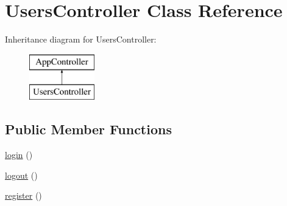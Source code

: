 \hypertarget{classUsersController}{
\section{\-Users\-Controller \-Class \-Reference}
\label{classUsersController}
}
\-Inheritance diagram for \-Users\-Controller\-:\begin{figure}[H]
\begin{center}
\leavevmode
\includegraphics[height=2.000000cm]{classUsersController}
\end{center}
\end{figure}
\subsection*{\-Public \-Member \-Functions}
\begin{DoxyCompactItemize}
\item 
\hyperlink{classUsersController_aacebe6314e911b87dfb28785e87519cc}{login} ()
\item 
\hyperlink{classUsersController_abd5055ae74c89e431b061463ef7f2787}{logout} ()
\item 
\hyperlink{classUsersController_aff5905416e027604f61edcbe2cac2692}{register} ()
\end{DoxyCompactItemize}


